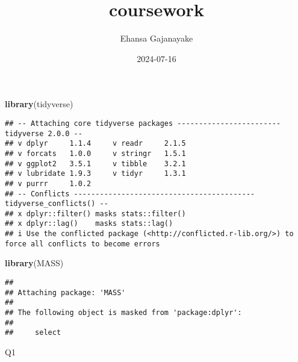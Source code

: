 \documentclass[
]{article}
\title{coursework}
\author{Ehansa Gajanayake}
\date{2024-07-16}
\newenvironment{Shaded}{\begin{snugshade}}{\end{snugshade}}
\newcommand{\FunctionTok}[1]{\textcolor[rgb]{0.13,0.29,0.53}{\textbf{#1}}}
\newcommand{\NormalTok}[1]{#1}
\begin{document}
\maketitle

\begin{Shaded}
\begin{Highlighting}[]
\FunctionTok{library}\NormalTok{(tidyverse)}
\end{Highlighting}
\end{Shaded}

\begin{verbatim}
## -- Attaching core tidyverse packages ------------------------ tidyverse 2.0.0 --
## v dplyr     1.1.4     v readr     2.1.5
## v forcats   1.0.0     v stringr   1.5.1
## v ggplot2   3.5.1     v tibble    3.2.1
## v lubridate 1.9.3     v tidyr     1.3.1
## v purrr     1.0.2     
## -- Conflicts ------------------------------------------ tidyverse_conflicts() --
## x dplyr::filter() masks stats::filter()
## x dplyr::lag()    masks stats::lag()
## i Use the conflicted package (<http://conflicted.r-lib.org/>) to force all conflicts to become errors
\end{verbatim}

\begin{Shaded}
\begin{Highlighting}[]
\FunctionTok{library}\NormalTok{(MASS)}
\end{Highlighting}
\end{Shaded}

\begin{verbatim}
## 
## Attaching package: 'MASS'
## 
## The following object is masked from 'package:dplyr':
## 
##     select
\end{verbatim}

Q1
\end{document}
